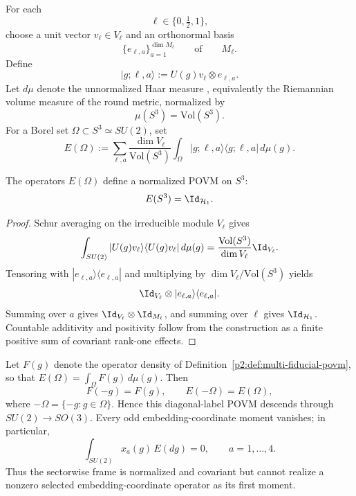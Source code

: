 \documentclass[11pt,a4paper]{article}
\begin{document}
\begin{definition}
\label{p2:def:multi-fiducial-povm}
\leavevmode\par\noindent
For each
\[
  \ell\in\{0,\tfrac12,1\},
\]
choose a unit vector \(v_\ell\in V_\ell\) and an orthonormal basis
\[
  \{e_{\ell,a}\}_{a=1}^{\dim M_\ell}
  \qquad\text{of}\qquad
  M_\ell .
\]
Define
\begin{equation}
  |g;\ell,a\rangle:=U(g)v_\ell\otimes e_{\ell,a}.
\end{equation}
Let \(d\mu\) denote the unnormalized Haar measure
\cite{haar1933mass}, equivalently the Riemannian
volume measure of the round metric, normalized by
\[
  \mu(S^3)=\mathrm{Vol}(S^3).
\]
For a Borel set \(\Omega\subset S^3\simeq SU(2)\), set
\begin{equation}
  E(\Omega):=
  \sum_{\ell,a}
  \frac{\dim V_\ell}{\mathrm{Vol}(S^3)}
  \int_\Omega |g;\ell,a\rangle\langle g;\ell,a|\,d\mu(g).
\end{equation}
\end{definition}

\begin{theorem}
\label{p2:thm:multi-fiducial-resolution}
The operators $E(\Omega)$ define a normalized POVM on $S^3$:
\begin{equation}
E(S^3)=\Id_{\mathcal H_1}.
\end{equation}
\end{theorem}

\begin{proof}
Schur averaging on the irreducible module \(V_\ell\)
\cite{Hall2015lie,fulton1991representation} gives
\[
\int_{SU(2)} |U(g)v_\ell\rangle\langle U(g)v_\ell|\,d\mu(g)
=\frac{\mathrm{Vol}(S^3)}{\dim V_\ell}\Id_{V_\ell}.
\]
Tensoring with $|e_{\ell,a}\rangle\langle e_{\ell,a}|$ and multiplying by $\dim V_\ell/\mathrm{Vol}(S^3)$ yields
\[
\Id_{V_\ell}\otimes |e_{\ell,a}\rangle\langle e_{\ell,a}|.
\]
Summing over $a$ gives $\Id_{V_\ell}\otimes\Id_{M_\ell}$, and summing over $\ell$ gives $\Id_{\mathcal H_1}$. Countable additivity and positivity follow from the construction as a finite positive sum of covariant rank-one effects.
\end{proof}

\begin{corollary}
\label{p2:cor:sectorwise-povm-center-blind}
Let \(F(g)\) denote the operator density of
Definition~\ref{p2:def:multi-fiducial-povm}, so that
\(E(\Omega)=\int_\Omega F(g)\,d\mu(g)\).  Then
\[
        F(-g)=F(g),
        \qquad
        E(-\Omega)=E(\Omega),
\]
where \(-\Omega=\{-g:g\in\Omega\}\).  Hence this diagonal-label POVM descends through
\(SU(2)\to SO(3)\).  Every odd embedding-coordinate moment vanishes; in
particular,
\[
        \int_{SU(2)}x_a(g)\,E(dg)=0,
        \qquad a=1,\ldots,4.
\]
Thus the sectorwise frame is normalized and covariant but cannot realize a
nonzero selected embedding-coordinate operator as its first moment.
\end{corollary}
\end{document}
